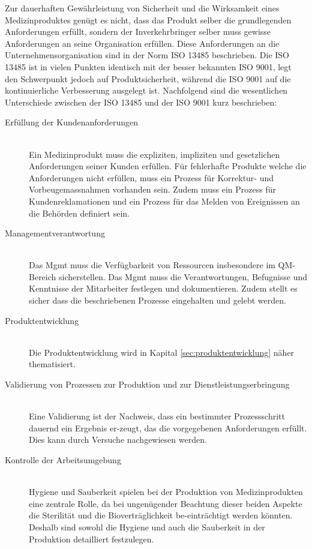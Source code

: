 Zur dauerhaften Gewährleistung von Sicherheit und die Wirksamkeit eines Medizinproduktes genügt es nicht, dass das Produkt selber die grundlegenden Anforderungen erfüllt, sondern der Inverkehrbringer selber muss gewisse Anforderungen an seine Organisation erfüllen. Diese Anforderungen an die Unternehmensorganisation sind in der Norm ISO 13485 beschrieben. Die ISO 13485 ist in vielen Punkten identisch mit der besser bekannten ISO 9001, legt den Schwerpunkt jedoch auf Produktsicherheit, während die ISO 9001 auf die kontinuierliche Verbesserung ausgelegt ist. Nachfolgend sind die wesentlichen Unterschiede zwischen der ISO 13485 und der ISO 9001 kurz beschrieben:
\begin{description}
	\item[Erfüllung der Kundenanforderungen] \hfil \\
	Ein Medizinprodukt muss die expliziten, impliziten und gesetzlichen Anforderungen seiner Kunden erfüllen. Für fehlerhafte Produkte welche die Anforderungen nicht erfüllen, muss ein Prozess für Korrektur- und Vorbeugemassnahmen vorhanden sein. Zudem muss ein Prozess für Kundenreklamationen und ein Prozess für das Melden von Ereignissen an die Behörden definiert sein.
	
	\item[Managementverantwortung] \hfil \\
	Das Mgmt muss die Verfügbarkeit von Ressourcen insbesondere im QM-Bereich sicherstellen. Das Mgmt muss die Verantwortungen, Befugnisse und Kenntnisse der Mitarbeiter festlegen und dokumentieren. Zudem stellt es sicher dass die beschriebenen Prozesse eingehalten und gelebt werden.
	
	\item[Produktentwicklung] \hfil \\
	Die Produktentwicklung wird in Kapital \ref{sec:produktentwicklung} näher thematisiert.
	
	\item[Validierung von Prozessen zur Produktion und zur Dienstleistungserbringung] \hfil \\
	Eine Validierung ist der Nachweis, dass ein bestimmter Prozessschritt dauernd ein Ergebnis er-zeugt, das die vorgegebenen Anforderungen erfüllt. Dies kann durch Versuche nachgewiesen werden.
	
	\item[Kontrolle der Arbeitsumgebung] \hfil \\
	Hygiene und Sauberkeit spielen bei der Produktion von Medizinprodukten eine zentrale Rolle, da bei ungenügender Beachtung dieser beiden Aspekte die Sterilität und die Bioverträglichkeit be-einträchtigt werden könnten. Deshalb sind sowohl die Hygiene und auch die Sauberkeit in der Produktion detailliert festzulegen.
	

\end{description}
